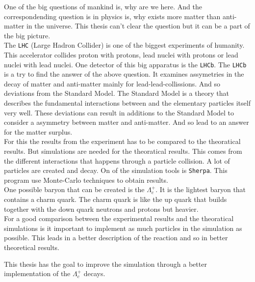 One of the big questions of mankind is, why are we here. And the correspondending 
question is in physics is, why exists more matter than anti-matter in the universe. 
This thesis can't clear the question but it can be a part of the big picture.\\
The \texttt{LHC} (Large Hadron Collider) is one of the biggest experiments of 
humanity. This accelerator collides proton with protons, lead nuclei with 
protons or lead nuclei with lead nuclei. One detector of this big apparatus 
is the \texttt{LHCb}. The \texttt{LHCb} is a try to find the answer of the 
above question. It examines assymetries in the decay of matter and 
anti-matter mainly for lead-lead-collissions. And so deviations 
from the Standard Model. The Standard Model is a theory that describes the 
fundamental interactions between and the elementary particles itself very 
well. These deviations can result in additions to the Standard Model to consider 
a asymmetry between matter and anti-matter. And so lead to an answer for the 
matter surplus.\\
For this the results from the experiment has to be compared to the 
theoratical results. But simulations are needed for the theoratical results. 
This comes from the different interactions that happens through a particle 
collision. A lot of particles are created and decay. On of the simulation 
tools is \texttt{Sherpa}. This program use Monte-Carlo techniques to obtain 
results.\\
One possible baryon that can be created is the \(\Lambda_c^+\). It is the 
lightest baryon that contains a charm quark. The charm quark is like the 
up quark that builds together with the down quark neutrons and protons but 
heavier.\\
For a good comparison between the experimental results and the theoratical 
simulations is it important to implement as much particles in the simulation 
as possible. This leads in a better description of the reaction and so in better 
theoretical results.
\par
This thesis has the goal to improve the simulation through a better implementation 
of the \(\Lambda_c^+\) decays.
